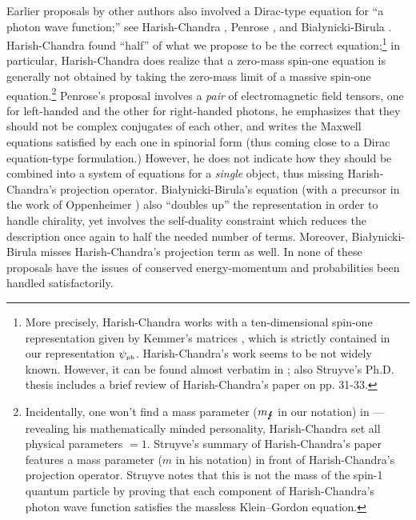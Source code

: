\documentclass[11pt]{article}
\theoremstyle{definition}
\numberwithin{equation}{section}
\newcommand{\psiPH}{{\psi_{\mbox{\rm\tiny ph}}}}
\newcommand{\mPH}{{m_{\mbox{\Lightning}}}}
\begin{document}
 Earlier proposals by other authors also involved a Dirac-type equation for ``a photon wave function;'' 
see Harish-Chandra \cite{HC1946}, Penrose \cite{Pen1976}, and Bia{\l}ynicki-Birula \cite{BiBiTHREE,IBBphotonREV}. 
 Harish-Chandra \cite{HC1946} found ``half'' of what we propose to be the correct equation;\footnote{More precisely, 
  Harish-Chandra works with a ten-dimensional spin-one representation given by Kemmer's matrices \cite{Kem1939}, 
  which is strictly contained in our representation $\psiPH$.
  Harish-Chandra's work seems to be not widely known.
  However, it can be found almost verbatim in \cite{Cor1953};
  also Struyve's Ph.D. thesis \cite{StruyvePHD} includes a brief review of Harish-Chandra's paper on pp. 31-33.}
in particular, Harish-Chandra does realize that a zero-mass spin-one equation is generally not obtained by taking the zero-mass limit of
a massive spin-one equation.\footnote{\label{fn:mzapp}Incidentally, one won't find a mass parameter ($\mPH$ in our notation) in \cite{HC1946} --- 
revealing his mathematically minded personality, Harish-Chandra set all physical parameters $=1$. 
  Struyve's summary of Harish-Chandra's paper features a mass parameter ($m$ in his notation) in front of Harish-Chandra's projection operator.
  Struyve notes that this is not the mass of the spin-1 quantum particle by proving that each component of Harish-Chandra's photon wave function 
 satisfies the massless Klein--Gordon equation.}
Penrose's proposal \cite{Pen1976} involves a {\em pair} of electromagnetic field tensors, one for left-handed and the other 
for right-handed photons, he emphasizes that they should not be complex conjugates of each other, and writes the Maxwell 
equations satisfied by each one in spinorial form (thus coming close to a Dirac equation-type formulation.)  
However, he does not indicate how they should be combined into a system of equations for a {\em single} object, thus
missing Harish-Chandra's projection operator.
 Bia{\l}ynicki-Birula's equation \cite{BiBiTHREE,IBBphotonREV} (with a precursor in the work of Oppenheimer \cite{OppiPHOTON}) also
``doubles up'' the representation in order to handle chirality, yet involves the self-duality constraint which reduces the description 
once again to half the needed number of terms. 
 Moreover, Bia{\l}ynicki-Birula misses Harish-Chandra's projection term as well.
 In none of these proposals have the issues of conserved energy-momentum and probabilities been handled satisfactorily.
 
\end{document}
